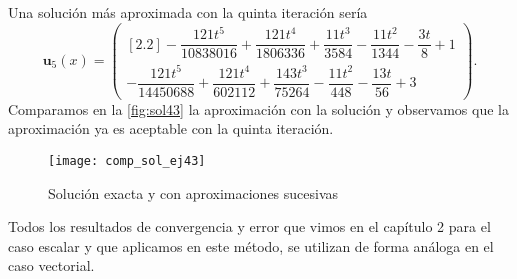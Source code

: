 \begin{ejemplo}
\begin{equation}
	\end{equation}
	Una solución más aproximada con la quinta iteración sería
	\begin{equation}
		\textbf{u}_{5}(x) = \begin{pmatrix}[2.2]	-\dfrac{121t^5}{10838016}+\dfrac{121t^4}{1806336}+\dfrac{11t^3}{3584}-\dfrac{11t^2}{1344}-\dfrac{3t}{8}+1 \\ -\dfrac{121t^5}{14450688}+\dfrac{121t^4}{602112}+\dfrac{143t^3}{75264}-\dfrac{11t^2}{448}-\dfrac{13t}{56}+3	\end{pmatrix}.
	\end{equation}
	Comparamos en la \autoref{fig:sol43} la aproximación con la solución y observamos que la aproximación ya es aceptable con la quinta iteración.
	\begin{figure}[h!]
		\centering
		\texttt{[image: comp\_sol\_ej43]}
		\caption{Solución exacta y con aproximaciones sucesivas}
		\label{fig:sol43}
	\end{figure}
\end{ejemplo}
\begin{observacion}
	Todos los resultados de convergencia y error que vimos en el capítulo 2 para el caso escalar y que aplicamos en este método, se utilizan de forma análoga en el caso vectorial.
\end{observacion}


\endinput
